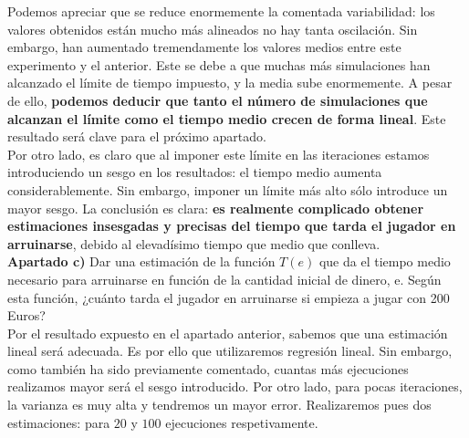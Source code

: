 \documentclass[a4paper]{article}
\begin{document}
Podemos apreciar que se reduce enormemente la comentada variabilidad: los valores obtenidos están mucho más alineados no hay tanta oscilación. Sin embargo, han aumentado tremendamente los valores medios entre este experimento y el anterior. Este se debe a que muchas más simulaciones han alcanzado el límite de tiempo impuesto, y la media sube enormemente. A pesar de ello, \textbf{podemos deducir que tanto el número de simulaciones que alcanzan el límite como el tiempo medio crecen de forma lineal}. Este resultado será clave para el próximo apartado. \\

Por otro lado, es claro que al imponer este límite en las iteraciones estamos introduciendo un sesgo en los resultados: el tiempo medio aumenta considerablemente. Sin embargo, imponer un límite más alto sólo introduce un mayor sesgo. La conclusión es clara: \textbf{es realmente complicado obtener estimaciones insesgadas y precisas del tiempo que tarda el jugador en arruinarse}, debido al elevadísimo tiempo que medio que conlleva. \\

\textbf{Apartado c)} Dar una estimación de la función $T(e)$ que da el tiempo medio necesario para arruinarse en función de la cantidad inicial de dinero, e. Según esta función, ¿cuánto tarda el jugador en arruinarse si empieza a jugar con 200 Euros? \\

Por el resultado expuesto en el apartado anterior, sabemos que una estimación lineal será adecuada. Es por ello que utilizaremos regresión lineal. Sin embargo, como también ha sido previamente comentado, cuantas más ejecuciones realizamos mayor será el sesgo introducido. Por otro lado, para pocas iteraciones, la varianza es muy alta y tendremos un mayor error. Realizaremos pues dos estimaciones: para $20$ y $100$ ejecuciones respetivamente.
\end{document}
